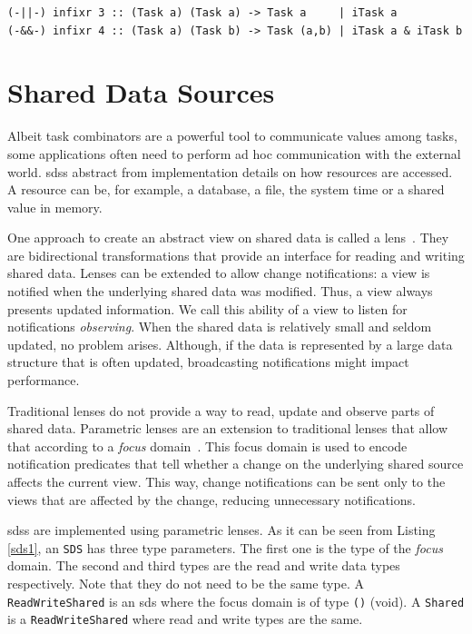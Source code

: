 \begin{lstlisting}[caption=Parallel combinators,label=par_comb,captionpos=b]
(-||-) infixr 3 :: (Task a) (Task a) -> Task a     | iTask a
(-&&-) infixr 4 :: (Task a) (Task b) -> Task (a,b) | iTask a & iTask b
\end{lstlisting}


\section{Shared Data Sources}

Albeit task combinators are a powerful tool to 
communicate values among tasks, some applications often need to perform ad hoc communication with the external world. \acp{sds} abstract from implementation details on how resources are accessed. A resource can be, for example, a database, a file, the system time or a shared value in memory. 

One approach to create an abstract view on shared data is called a lens~\cite{lenses}. They are bidirectional transformations that provide an interface for reading and writing shared data. Lenses can be extended to allow change notifications: a view is notified when the underlying shared data was modified. Thus, a view always presents updated information. We call this ability of a view to listen for notifications \textit{observing}. When the shared data is relatively small and seldom updated, no problem arises. Although, if the data is represented by a large data structure that is often updated, broadcasting notifications might impact performance. 

Traditional lenses do not provide a way to read, update and observe parts of shared data. Parametric lenses are an extension to traditional lenses that allow that according to a \textit{focus} domain~\cite{parametric}. This focus domain is used to encode notification predicates that tell whether a change on the underlying shared source affects the current view. This way, change notifications can be sent only to the views that are affected by the change, reducing unnecessary notifications.

\acp{sds} are implemented using parametric lenses. As it can be seen from Listing \ref{sds1}, an \texttt{SDS} has three type parameters. The first one is the type of the \textit{focus} domain. The second and third types are the read and write data types respectively. Note that they do not need to be the same type. A \texttt{ReadWriteShared} is an \ac{sds} where the focus domain is of type \texttt{()} (void). A \texttt{Shared} is a \texttt{ReadWriteShared} where read and write types are the same.

